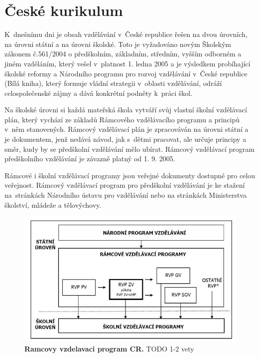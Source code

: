 	\section{České kurikulum}

		K dnešnímu dni je obsah vzdělávání v České republice řešen na dvou úrovních, na úrovni státní a na úrovni školské. Toto je vyžadováno novým Školským zákonem č.561/2004 o předškolním, základním, středním, vyšším odborném a jiném vzděláním, který vešel v platnost 1. ledna 2005 a je výsledkem probíhající školské reformy a Národního programu pro rozvoj vzdělávání v České republice (Bílá kniha), který formuje vládní strategii v oblasti vzdělávání, odráží celospolečenské zájmy a dává konkrétní podněty k práci škol.

		Na školské úrovni si každá mateřská škola vytváří svůj vlastní školní vzdělávací plán, který vychází ze základů Rámcového vzdělávacího programu a principů v něm stanovených. Rámcový vzdělávací plán je zpracováván na úrovni státní a je dokumentem, jenž nedává návod, jak s dětmi pracovat, ale určuje principy a směr, kudy by se předškolní vzdělávání mělo ubírat. Rámcový vzdělávací program předškolního vzdělávání je závazně platný od 1. 9. 2005.

		Rámcové i školní vzdělávací programy jsou veřejné dokumenty dostupné pro celou veřejnost. Rámcový vzdělávací program pro předškolní vzdělávání je ke stažení na stránkách Národního ústavu pro vzdělávání \citep{RVP} nebo na stránkách Ministerstva školství, mládeže a tělovýchovy.

		
		\begin{figure}[h!t]
			\center
			\includegraphics[width=0.8\linewidth]{fotky/rvpCR.jpg}
			\caption{\textbf{Ramcovy vzdelavaci program CR.}
				TODO 1-2 vety
			}
			\label{obr:rvpCR}
		\end{figure}


